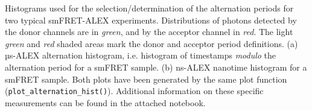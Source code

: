 \label{fig:altern_hist_double} 
Histograms used for the selection/determination of the alternation periods for two typical smFRET-ALEX experiments.
Distributions of photons detected by the donor channels are in \textit{green}, and by the acceptor channel in \textit{red}.
The light \textit{green} and \textit{red} shaded areas mark the donor and acceptor period definitions.
(a) µs-ALEX alternation histogram, i.e. histogram of timestamps \textit{modulo} the alternation period for a smFRET sample. 
(b) ns-ALEX nanotime histogram for a smFRET sample. 
Both plots have been generated by the same plot function (\texttt{plot\_alternation\_hist()}). 
Additional information on these specific measurements can be found in the  attached notebook.